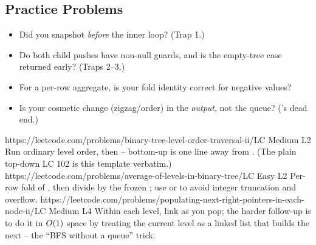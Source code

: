 \subsection{Practice Problems}

\begin{stuckbox}
\begin{itemize}[nosep, leftmargin=1.4em]
  \item Did you snapshot  \emph{before} the inner loop? (Trap 1.)
  \item Do both child pushes have non-null guards, and is the empty-tree case returned
        early? (Traps 2--3.)
  \item For a per-row aggregate, is your fold identity correct for negative values?
  \item Is your cosmetic change (zigzag/order) in the \emph{output}, not the queue?
        ('s dead end.)
\end{itemize}
\end{stuckbox}

\begin{practiceset}
    {https://leetcode.com/problems/binary-tree-level-order-traversal-ii/}{LC Medium L2}
    {Run ordinary level order, then  -- bottom-up is one line away from
    . (The plain top-down LC 102 is this template verbatim.)}
    {https://leetcode.com/problems/average-of-levels-in-binary-tree/}{LC Easy L2}
    {Per-row fold of , then divide by the frozen ; use 
    or  to avoid integer truncation and overflow.}
    {https://leetcode.com/problems/populating-next-right-pointers-in-each-node-ii/}{LC Medium L4}
    {Within each level, link  as you pop; the harder follow-up is to
    do it in $O(1)$ space by treating the current level as a linked list that builds
    the next -- the ``BFS without a queue'' trick.}
\end{practiceset}

